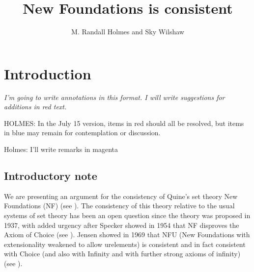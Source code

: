 \documentclass[112pt]{article}
\title{New Foundations is consistent}
\author{M. Randall Holmes and Sky Wilshaw}
\theoremstyle{definition}
\theoremstyle{remark}
\newcommand{\suggest}[1]{{\color{red} #1}}
\newcommand{\hsuggest}[1]{{\color{magenta}#1}}
\newenvironment{annot}{\begin{center}\color{blue}\sl}{\end{center}}
\begin{document}
\maketitle

\tableofcontents

\newpage


\newpage

\section{Introduction}

\begin{annot}
  I'm going to write annotations in this format.
  I will write suggestions for additions in \suggest{red text}.

HOLMES:  In the July 15 version, items in red should all be resolved, but items in blue may remain for contemplation or discussion.
\end{annot}

\hsuggest{Holmes: I'll write remarks in magenta}

\subsection{Introductory note}

We are presenting an argument for the consistency of Quine's set theory New Foundations (NF) (see \cite{nf}).  The consistency of this theory relative to the usual systems of set theory has been an open question since the theory was proposed in 1937, with added urgency after Specker showed in 1954 that NF disproves the Axiom of Choice (see \cite{notac}).
Jensen showed in 1969 that NFU (New Foundations with extensionality weakened to allow urelements) is consistent and in fact consistent with Choice (and also with Infinity and with further strong axioms of infinity) (see \cite{nfu}).
\end{document}
